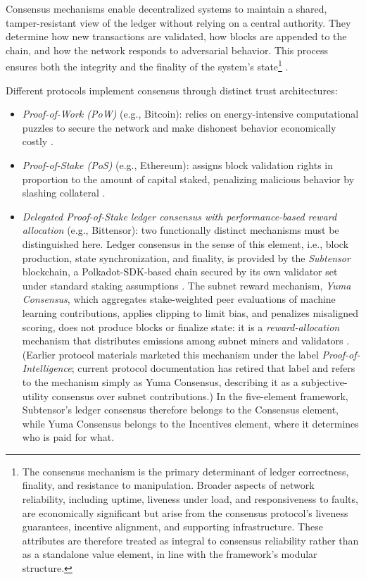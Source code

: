 \documentclass[12pt]{article}
\begin{document}
Consensus mechanisms enable decentralized systems to maintain a shared, tamper-resistant view of the ledger without relying on a central authority. They determine how new transactions are validated, how blocks are appended to the chain, and how the network responds to adversarial behavior. This process ensures both the integrity and the finality of the system’s state\footnote{The consensus mechanism is the primary determinant of ledger correctness, finality, and resistance to manipulation. Broader aspects of network reliability, including uptime, liveness under load, and responsiveness to faults, are economically significant but arise from the consensus protocol’s liveness guarantees, incentive alignment, and supporting infrastructure. These attributes are therefore treated as integral to consensus reliability rather than as a standalone value element, in line with the framework’s modular structure.}
 \citep{saleh2021blockchain, biais2020blockchain}.

Different protocols implement consensus through distinct trust architectures:

\begin{itemize}
    \item \textit{Proof-of-Work (PoW)} (e.g., Bitcoin): relies on energy-intensive computational puzzles to secure the network and make dishonest behavior economically costly \citep{nakamoto2008bitcoin}.
    
    \item \textit{Proof-of-Stake (PoS)} (e.g., Ethereum): assigns block validation rights in proportion to the amount of capital staked, penalizing malicious behavior by slashing collateral \citep{buterin2022proof}.
    
    \item \textit{Delegated Proof-of-Stake ledger consensus with performance-based reward allocation} (e.g., Bittensor): two functionally distinct mechanisms must be distinguished here. Ledger consensus in the sense of this element, i.e., block production, state synchronization, and finality, is provided by the \textit{Subtensor} blockchain, a Polkadot-SDK-based chain secured by its own validator set under standard staking assumptions \citep{rao2020bittensor}. The subnet reward mechanism, \textit{Yuma Consensus}, which aggregates stake-weighted peer evaluations of machine learning contributions, applies clipping to limit bias, and penalizes misaligned scoring, does not produce blocks or finalize state: it is a \emph{reward-allocation} mechanism that distributes emissions among subnet miners and validators \citep{rao2020bittensor, yuma2025yuma}. (Earlier protocol materials marketed this mechanism under the label \textit{Proof-of-Intelligence}; current protocol documentation has retired that label and refers to the mechanism simply as Yuma Consensus, describing it as a subjective-utility consensus over subnet contributions.) In the five-element framework, Subtensor's ledger consensus therefore belongs to the Consensus element, while Yuma Consensus belongs to the Incentives element, where it determines who is paid for what.

\end{itemize}
\end{document}
